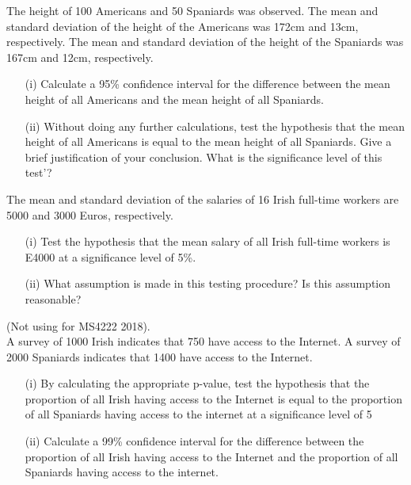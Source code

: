 \item 
The height of 100 Americans and 50 Spaniards was observed. The mean and
standard deviation of the height of the Americans was 172cm and 13cm,
respectively. The mean and standard deviation of the height of the Spaniards
was 167cm and 12cm, respectively.

\begin{itemize}
	\item[(i)]Calculate a 95\% confidence interval for the difference between the mean height
	of all Americans and the mean height of all Spaniards.
	
	
	\item[(ii)] Without doing any further calculations, test the hypothesis that the mean
	height of all Americans is equal to the mean height of all Spaniards. Give a brief
	justification of your conclusion. What is the significance level of this test'?
\end{itemize}

\item 
The mean and standard deviation of the salaries of 16 Irish full-time workers are 5000 and 3000 Euros, respectively.
\begin{itemize}
	\item[(i)] Test the hypothesis that the mean salary of all Irish full-time workers is E4000 at a significance level of 5\%.
	\item[(ii)] What assumption is made in this testing procedure? Is this assumption reasonable?
\end{itemize}

\item (Not using for MS4222 2018).\\
A survey of 1000 Irish indicates that 750 have access to the Internet. A survey of 2000 Spaniards
indicates that 1400 have access to the Internet.
\begin{itemize}
	\item[(i)]  By calculating the appropriate p-value, test the hypothesis that the proportion of all Irish
	having access to the Internet is equal to the proportion of all Spaniards having access to the
	internet at a significance level of 5%
	
	\item[(ii)] Calculate a 99\% confidence interval for the difference between the proportion of all Irish
	having access to the Internet and the proportion of all Spaniards having access to the
	internet.
\end{itemize}

